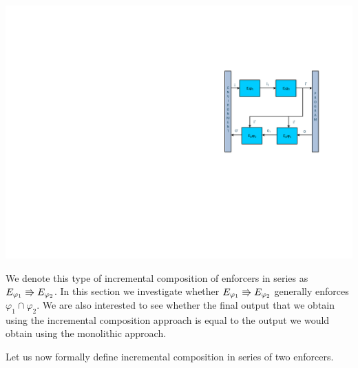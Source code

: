 \begin{SingleColFigure}
	\centering
	\includegraphics[width=\columnwidth]{fig/serial composition-ColourDiagram-cropped2.pdf}
	
	\label{fig:serialComp1}
\end{SingleColFigure}

We denote this type of incremental composition of enforcers in series as  $E_{{\varphi_1}} \Rrightarrow E_{{\varphi_2}}$.
In this section we investigate whether $E_{{\varphi_1}} \Rrightarrow E_{{\varphi_2}}$
generally enforces $\varphi_1\cap\varphi_2$.
We are also interested to see whether the final output that we obtain using the incremental composition approach is equal to the output we would obtain using the monolithic approach.

Let us now formally define incremental composition in series of two enforcers.


